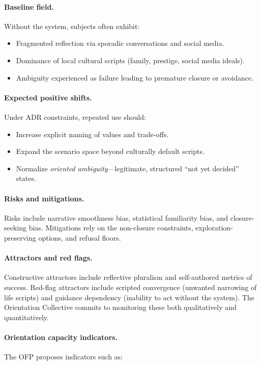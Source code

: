 \documentclass[11pt]{article}
\begin{document}
\paragraph{Baseline field.} Without the system, subjects often exhibit:

\begin{itemize}[nosep]
  \item Fragmented reflection via sporadic conversations and social media.
  \item Dominance of local cultural scripts (family, prestige, social media ideals).
  \item Ambiguity experienced as failure leading to premature closure or avoidance.
\end{itemize}

\paragraph{Expected positive shifts.} Under ADR constraints, repeated use should:

\begin{itemize}[nosep]
  \item Increase explicit naming of values and trade-offs.
  \item Expand the scenario space beyond culturally default scripts.
  \item Normalize \emph{oriented ambiguity}---legitimate, structured ``not yet decided'' states.
\end{itemize}

\paragraph{Risks and mitigations.} Risks include narrative smoothness bias, statistical familiarity bias, and closure-seeking bias. Mitigations rely on the non-closure constraints, exploration-preserving options, and refusal floors.

\paragraph{Attractors and red flags.} Constructive attractors include reflective pluralism and self-authored metrics of success. Red-flag attractors include scripted convergence (unwanted narrowing of life scripts) and guidance dependency (inability to act without the system). The Orientation Collective commits to monitoring these both qualitatively and quantitatively.

\paragraph{Orientation capacity indicators.} The OFP proposes indicators such as:
\end{document}

